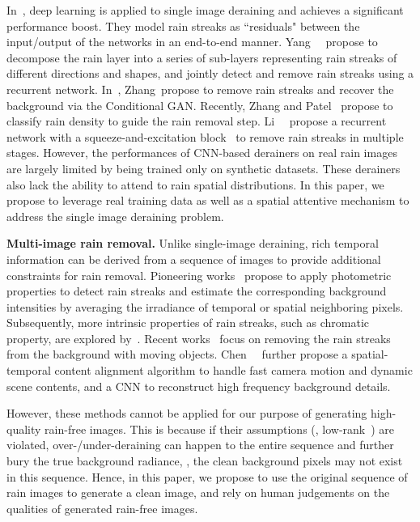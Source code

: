\documentclass[10pt,twocolumn,letterpaper]{article}
\begin{document}
In~\cite{fu:cvpe:2017:ddn,fu:tip:2016:clearing}, deep learning is applied to single image deraining and achieves a significant performance boost. They model rain streaks as ``residuals" between the input/output of the networks in an end-to-end manner.
Yang~\etal~\cite{yang:cvpr:2017:j} propose to decompose the rain layer into a series of sub-layers representing rain streaks of different directions and shapes, and jointly detect and remove rain streaks using a recurrent network.
In~\cite{zhang:arxiv:2017:gan}, Zhang~\etal propose to remove rain streaks and recover the background via the Conditional GAN.
Recently, Zhang and Patel~\cite{zhang:cvpr:2018:did} propose to classify rain density to guide the rain removal step.
Li~\etal~\cite{li:eccv:2018:rsecan} propose a recurrent network with a squeeze-and-excitation block~\cite{hu:cvpr:2018:senet} to remove rain streaks in multiple stages.
However, the performances of CNN-based derainers on real rain images are largely limited by being trained only on synthetic datasets. These derainers also lack the ability to attend to rain spatial distributions. In this paper, we propose to leverage real training data as well as a spatial attentive mechanism to address the single image deraining problem.



{\bf Multi-image rain removal.} Unlike single-image deraining, rich temporal information can be derived from a sequence of images to provide additional constraints for rain removal. Pioneering works~\cite{garg:cvpr:2004:detection,garg:ijcv:2007:vision} propose to apply photometric properties to detect rain streaks and estimate the corresponding background intensities by averaging the irradiance of temporal or spatial neighboring pixels. Subsequently, more intrinsic properties of rain streaks, such as chromatic property, are explored by~\cite{zhang:icme:2006:temporal,liu:cis:2009:pixel,santhaseelan:ijcv:2015:utilizing}. Recent works~\cite{bossu:ijcv:2011:raindetection,chen:iccv:2013:generalized,chen:tip:2014:rpra,kim:tip:2015:videoderain,jiang:cvpr:2017:dip,ren:cvpr:2017:md,wei:iccv:2017:ds,li:cvpr:2018:mcsc,liu:cvpr:2018:j4r} focus on removing the rain streaks from the background with moving objects. Chen~\etal~\cite{chen:cvpr:2018:videoderaincnn} further propose a spatial-temporal content alignment algorithm to handle fast camera motion and dynamic scene contents, and a CNN to reconstruct high frequency background details.

However, these methods cannot be applied for our purpose of generating high-quality rain-free images. This is because if their assumptions (\eg, low-rank~\cite{chen:iccv:2013:generalized,wei:iccv:2017:ds,li:cvpr:2018:mcsc}) are violated, over-/under-deraining can happen to the entire sequence and further bury the true background radiance, \ie, the clean background pixels may not exist in this sequence. Hence, in this paper, we propose to use the original sequence of rain images to generate a clean image, and rely on human judgements on the qualities of generated rain-free images.
\end{document}
